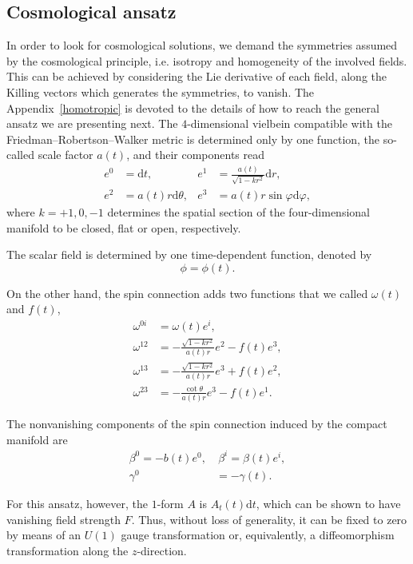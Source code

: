 \documentclass[aps,prd,12pt,superscriptaddress,showpacs,showkeys,longbibliography,reprint,nofootinbib]{revtex4-1}
\begin{document}
\subsection{Cosmological ansatz}

In order to look for cosmological solutions, we demand the symmetries assumed by the cosmological principle, i.e. isotropy and homogeneity of the involved fields. This can be achieved by considering the Lie derivative of each field, along the Killing vectors which generates the symmetries, to vanish. The Appendix~\ref{homotropic} is devoted to the details of how to reach the general ansatz we are presenting next. The $4$-dimensional vielbein compatible with the Friedman--Robertson--Walker metric is determined only by one function, the so-called scale factor $a(t)$, and their components read
\begin{align}
  \label{vielbein cosmo}
  e^0&=\mbox{d}t, & e^1&=\frac{a(t)}{\sqrt{1-kr^2}}\mbox{d}r,\\
  e^2&=a(t)r\mbox{d}\theta, & e^3&=a(t)r\sin\varphi\mbox{d}\varphi, 
\end{align}
where $k=+1,0,-1$ determines the spatial section of the four-dimensional manifold to be closed, flat or open, respectively. 

The scalar field is determined by one time-dependent function, denoted by
\begin{equation}
  \phi=\phi(t).
\end{equation}

On the other hand, the spin connection adds two functions that we called $\omega(t)$ and $f(t)$,
\begin{align}
  \omega^{0i}&=\omega(t) e^i,\\
  \omega^{12}&=-\frac{\sqrt{1-kr^2}}{a(t)r}e^2-f(t)e^3,\\
  \omega^{13}&=-\frac{\sqrt{1-kr^2}}{a(t)r}e^3+f(t)e^2,\\
  \omega^{23}&=-\frac{\cot\theta}{a(t)r}e^3-f(t)e^1.
\end{align}

The nonvanishing components of the spin connection induced by the compact manifold are
\begin{align}
  \beta^0=-b(t)e^0,&\ \beta^i=\beta(t)e^i,\\
  \label{gamma cosmo}
  \gamma^0&=-\gamma(t).
\end{align}

For this ansatz, however, the $1$-form $A$ is $A_t(t)\text{d}t$, which can be shown to have vanishing field strength $F$. Thus, without loss of generality, it can be fixed to zero by means of an $U(1)$ gauge transformation or, equivalently, a diffeomorphism transformation along the $z$-direction.
\end{document}
